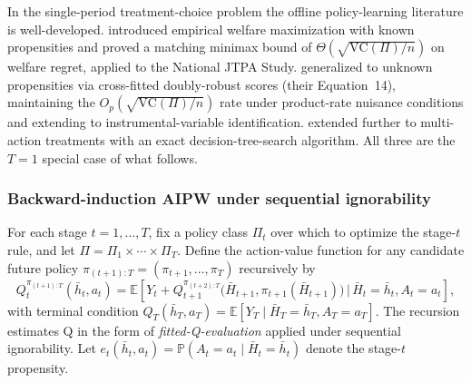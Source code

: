 In the single-period treatment-choice problem the offline policy-learning literature is well-developed. \citet{kitagawa2018who} introduced empirical welfare maximization with known propensities and proved a matching minimax bound of $\Theta(\sqrt{\mathrm{VC}(\Pi)/n})$ on welfare regret, applied to the National JTPA Study. \citet{athey2021policy} generalized to unknown propensities via cross-fitted doubly-robust scores (their Equation~14), maintaining the $O_p(\sqrt{\mathrm{VC}(\Pi)/n})$ rate under product-rate nuisance conditions and extending to instrumental-variable identification. \citet{zhou2023offline} extended further to multi-action treatments with an exact decision-tree-search algorithm. All three are the $T = 1$ special case of what follows.

\subsubsection*{Backward-induction AIPW under sequential ignorability}

For each stage $t = 1, \ldots, T$, fix a policy class $\Pi_t$ over which to optimize the stage-$t$ rule, and let $\Pi = \Pi_1 \times \cdots \times \Pi_T$. Define the action-value function for any candidate future policy $\pi_{(t+1):T} = (\pi_{t+1}, \ldots, \pi_T)$ recursively by
\begin{equation}
Q^{\pi_{(t+1):T}}_t(\bar h_t, a_t) = \mathbb{E}\!\left[Y_t + Q^{\pi_{(t+2):T}}_{t+1}\bigl(\bar H_{t+1}, \pi_{t+1}(\bar H_{t+1})\bigr) \,\Big|\, \bar H_t = \bar h_t, A_t = a_t\right],
\label{eq:sakaguchi_q}
\end{equation}
with terminal condition $Q_T(\bar h_T, a_T) = \mathbb{E}[Y_T \mid \bar H_T = \bar h_T, A_T = a_T]$. The recursion estimates Q in the form of \emph{fitted-Q-evaluation} \citep{Ernst2005} applied under sequential ignorability. Let $e_t(\bar h_t, a_t) = \mathbb{P}(A_t = a_t \mid \bar H_t = \bar h_t)$ denote the stage-$t$ propensity.

